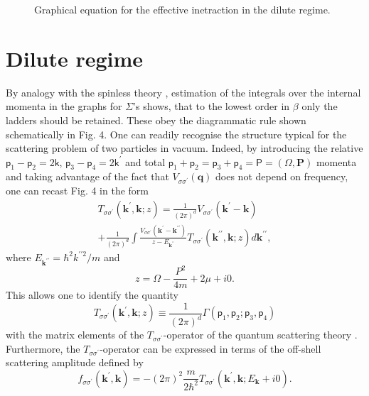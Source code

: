 \documentclass[reprint,superscriptaddress,showpacs,nofootinbib,aps,pra]{revtex4-1}
\begin{document}
\begin{figure*}[t]
  \noindent{}
  \caption{Graphical equation for the effective inetraction in the dilute regime.}
  \label{Vertex}
\end{figure*}

\section{Dilute regime}

By analogy with the spinless theory \cite{Beliaev, Lozovik}, estimation of the integrals over the internal momenta in the graphs for $\Sigma$'s shows, that to the lowest order in $\beta$ only the ladders should be retained. These obey the diagrammatic rule shown schematically in Fig. 4. One can readily recognise the structure typical for the scattering problem of two particles in vacuum. Indeed, by introducing the relative $\mathsf p_1-\mathsf p_2=2\mathsf k$, $\mathsf p_3-\mathsf p_4=2\mathsf k^\prime$ and total $\mathsf p_1+\mathsf p_2=\mathsf p_3+\mathsf p_4=\mathsf P=(\Omega, \bm{P})$ momenta and taking advantage of the fact that $V_{\sigma\sigma^\prime}(\bm q)$ does not depend on frequency, one can recast Fig. 4 in the form
\begin{multline}\label{Vert2}
T_{\sigma\sigma^\prime}(\bm k^\prime,\bm k; z) = \frac{1}{(2\pi)^d}V_{\sigma\sigma^\prime}(\textbf{k}^\prime-\bm k)\\
 +\frac{1}{(2\pi)^d} \int \frac{V_{\sigma\sigma^\prime}(\textbf{k}^\prime - \textbf{k}^{\prime\prime})}{z-E_{\bm k^{\prime\prime}}}T_{\sigma\sigma^\prime}(\bm k^{\prime\prime},\bm k; z) d\bm k^{\prime\prime},
\end{multline}
where $E_{\bm k^{\prime\prime}}=\hbar^2 k^{\prime\prime 2}/m$ and
\begin{equation}\label{Kappa1}
z=\Omega - \frac{P^2}{4m} + 2\mu+i0.
\end{equation}
This allows one to identify the quantity
\begin{equation*}
 T_{\sigma\sigma^\prime}(\bm k^\prime,\bm k; z)\equiv\frac{1}{(2\pi)^d}\Gamma(\mathsf p_1,\mathsf p_2;\mathsf p_3,\mathsf p_4)
 \end{equation*}
 with the matrix elements of the $T_{\sigma\sigma^\prime}$-operator of the quantum scattering theory \cite{Taylor}. Furthermore, the $T_{\sigma\sigma^\prime}$-operator can be expressed in terms of the off-shell scattering amplitude defined by
\begin{equation}
f_{\sigma\sigma^\prime}(\bm k^\prime,\bm k)=-(2\pi)^2\frac{m}{2\hbar^2}T_{\sigma\sigma^\prime}(\bm k^\prime,\bm k; E_{\bm k}+i0).
\end{equation}
\end{document}
